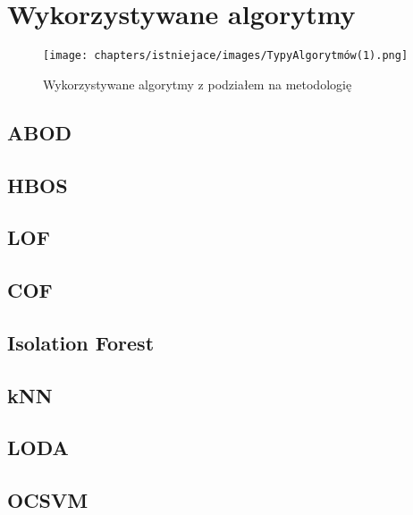 \section{Wykorzystywane algorytmy}

\begin{figure}
    \centering
    \texttt{[image: chapters/istniejace/images/TypyAlgorytmów(1).png]}
    \caption{Wykorzystywane algorytmy z podziałem na metodologię}
    \label{fig:typy}
\end{figure}
\subsection{ABOD}
\subsection{HBOS}
\subsection{LOF}
\subsection{COF}
\subsection{Isolation Forest}
\subsection{kNN}
\subsection{LODA}
\subsection{OCSVM}